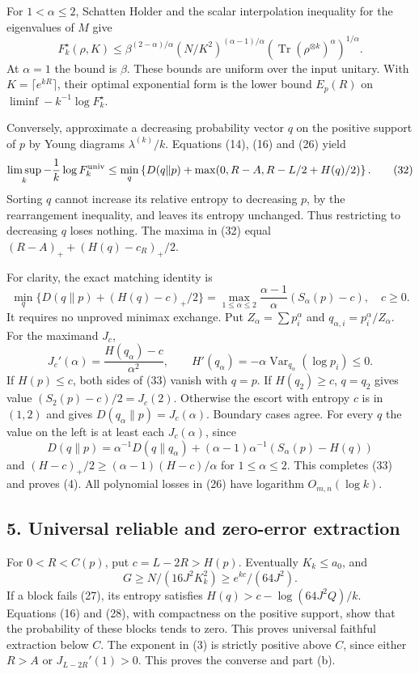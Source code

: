 \documentclass[11pt]{article}
\begin{document}
For \(1<\alpha\le2\), Schatten Holder and the scalar interpolation inequality for the eigenvalues of \(M\) give \[
 F_k^\star(\rho,K)\le
 \beta^{(2-\alpha)/\alpha}
 (N/K^2)^{(\alpha-1)/\alpha}
 \left(\operatorname{Tr}(\rho^{\otimes k})^\alpha\right)^{1/\alpha}.
 \tag{31}
\] At \(\alpha=1\) the bound is \(\beta\). These bounds are uniform over the input unitary. With \(K=\lceil e^{kR}\rceil\), their optimal exponential form is the lower bound \(E_p(R)\) on \(\liminf-k^{-1}\log F_k^\star\).

Conversely, approximate a decreasing probability vector \(q\) on the positive support of \(p\) by Young diagrams \(\lambda^{(k)}/k\). Equations (14), (16) and (26) yield \[
 \limsup_k-\frac1k\log F_k^{\rm univ}
 \le\min_q\left\{D(q\|p)+\max(0,R-A,R-L/2+H(q)/2)\right\}.
 \tag{32}
\] Sorting \(q\) cannot increase its relative entropy to decreasing \(p\), by the rearrangement inequality, and leaves its entropy unchanged. Thus restricting to decreasing \(q\) loses nothing. The maxima in (32) equal \((R-A)_++(H(q)-c_R)_+/2\).

For clarity, the exact matching identity is \[
 \min_q\{D(q\|p)+(H(q)-c)_+/2\}
 =\max_{1\le\alpha\le2}\frac{\alpha-1}{\alpha}(S_\alpha(p)-c),\quad c\ge0.
 \tag{33}
\] It requires no unproved minimax exchange. Put \(Z_\alpha=\sum p_i^\alpha\) and \(q_{\alpha,i}=p_i^\alpha/Z_\alpha\). For the maximand \(J_c\), \[
 J_c'(\alpha)=\frac{H(q_\alpha)-c}{\alpha^2},\qquad
 H'(q_\alpha)=-\alpha\operatorname{Var}_{q_\alpha}(\log p_i)\le0.
 \tag{34}
\] If \(H(p)\le c\), both sides of (33) vanish with \(q=p\). If \(H(q_2)\ge c\), \(q=q_2\) gives value \((S_2(p)-c)/2=J_c(2)\). Otherwise the escort with entropy \(c\) is in \((1,2)\) and gives \(D(q_\alpha\|p)=J_c(\alpha)\). Boundary cases agree. For every \(q\) the value on the left is at least each \(J_c(\alpha)\), since \[
 D(q\|p)=\alpha^{-1}D(q\|q_\alpha)
          +(\alpha-1)\alpha^{-1}(S_\alpha(p)-H(q))
\] and \((H-c)_+/2\ge(\alpha-1)(H-c)/\alpha\) for \(1\le\alpha\le2\). This completes (33) and proves (4). All polynomial losses in (26) have logarithm \(O_{m,n}(\log k)\).

\hypertarget{universal-reliable-and-zero-error-extraction}{%
\subsection{5. Universal reliable and zero-error extraction}\label{universal-reliable-and-zero-error-extraction}}

For \(0<R<C(p)\), put \(c=L-2R>H(p)\). Eventually \(K_k\le a_0\), and \[
 G\ge N/(16J^2K_k^2)\ge e^{kc}/(64J^2).
 \tag{35}
\] If a block fails (27), its entropy satisfies \(H(q)>c-\log(64J^2Q)/k\). Equations (16) and (28), with compactness on the positive support, show that the probability of these blocks tends to zero. This proves universal faithful extraction below \(C\). The exponent in (3) is strictly positive above \(C\), since either \(R>A\) or \(J_{L-2R}'(1)>0\). This proves the converse and part (b).
\end{document}
